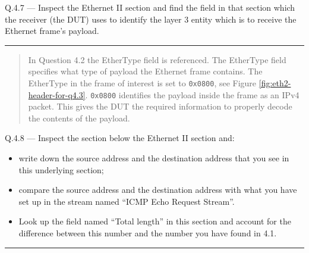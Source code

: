 \documentclass{article}
\newcommand\Que[2]{%
   \begin{samepage}
   \leavevmode\par
   \noindent
   Q.#1 --- #2\par\vspace{10pt}\hrule\vspace{10pt}
   \end{samepage}}
\newenvironment{ans}
   {\fbox{Answer}\begin{quote}\nopagebreak}
   {\end{quote}}
\begin{document}
\Que{4.7}{Inspect the Ethernet II section and find the field in
that section which the receiver (the DUT) uses to identify the
layer 3 entity which is to receive the Ethernet frame's
payload.}
\begin{ans}
	In Question 4.2 the EtherType field is referenced. The EtherType field specifies what type of payload the Ethernet frame contains. The EtherType in the frame of interest is set to \texttt{0x0800}, see Figure \ref{fig:eth2-header-for-q4.3}. \texttt{0x0800} identifies the payload inside the frame as an IPv4 packet. This gives the DUT the required information to properly decode the contents of the payload.
\end{ans}

\Que{4.8}{Inspect the section below the Ethernet II section and:
\begin{itemize}
\item write down the source address and the destination address
   that you see in this underlying section;
\item compare the source address and the destination address
   with what you have set up in the stream named ``ICMP Echo
   Request Stream''.
\item Look up the field named ``Total length'' in this section
   and account for the difference between this number and the
   number you have found in 4.1.
\end{itemize}}
\end{document}
